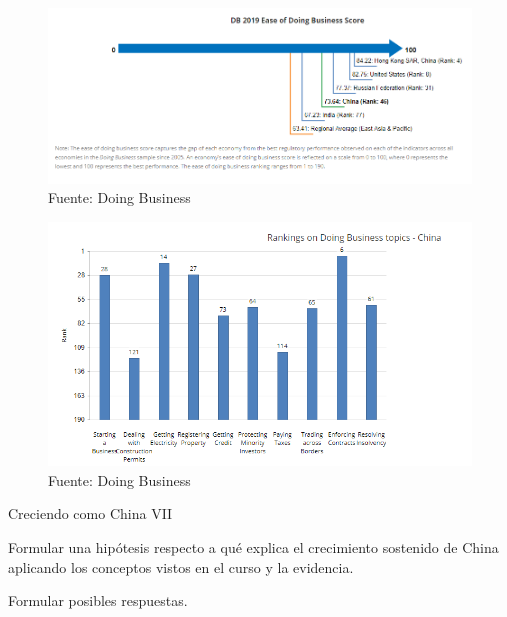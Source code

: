 \documentclass{beamer}
\let\tempone\itemize
\let\temptwo\enditemize
\renewenvironment{itemize}{\tempone\addtolength{\itemsep}{0.5\baselineskip}}{\temptwo}
\begin{document}
	\begin{frame}[plain]
		\begin{figure}
			\centering
			\includegraphics[width=\linewidth, keepaspectratio]{doing_business_rank} \\
			{\footnotesize{Fuente: Doing Business}}
		\end{figure}
	\end{frame}

	\begin{frame}[plain]
		\begin{figure}
			\centering
			\includegraphics[width=\linewidth, keepaspectratio]{doing_business_rank_components} \\
			{\footnotesize{Fuente: Doing Business}}
		\end{figure}
	\end{frame}

	\begin{frame}{Creciendo como China VII}
		\begin{itemize}
			\item Formular una hipótesis respecto a qué explica el crecimiento sostenido de China aplicando los conceptos vistos en el curso y la evidencia.
			\item Formular posibles respuestas.
		\end{itemize}
	\end{frame}	
\end{document}

